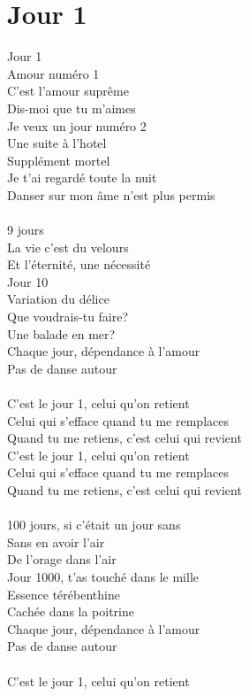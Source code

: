 \section*{Jour 1}
Jour 1\\
Amour numéro 1\\
C'est l'amour suprême\\
Dis-moi que tu m'aimes\\
Je veux un jour numéro 2\\
Une suite à l'hotel\\
Supplément mortel\\
Je t'ai regardé toute la nuit\\
Danser sur mon âme n'est plus permis\\\\
9 jours\\
La vie c'est du velours\\
Et l'éternité, une nécessité\\
Jour 10\\
Variation du délice\\
Que voudrais-tu faire?\\
Une balade en mer?\\
Chaque jour, dépendance à l'amour\\
Pas de danse autour\\\\
C'est le jour 1, celui qu'on retient\\
Celui qui s'efface quand tu me remplaces\\
Quand tu me retiens, c'est celui qui revient\\
C'est le jour 1, celui qu'on retient\\
Celui qui s'efface quand tu me remplaces\\
Quand tu me retiens, c'est celui qui revient\\\\
100 jours, si c'était un jour sans\\
Sans en avoir l'air\\
De l'orage dans l'air\\
Jour 1000, t'as touché dans le mille\\
Essence térébenthine\\
Cachée dans la poitrine\\
Chaque jour, dépendance à l'amour\\
Pas de danse autour\\\\
C'est le jour 1, celui qu'on retient\\
